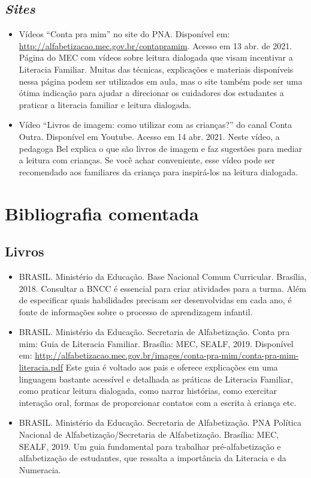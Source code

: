 \documentclass[11pt]{extarticle}
\begin{document}
\subsection{\textit{Sites}}

\begin{itemize}
\item Vídeos “Conta pra mim” no site do PNA. Disponível em: \url{http://alfabetizacao.mec.gov.br/contapramim}. 
Acesso em 13 abr. de 2021.
Página do MEC com vídeos sobre leitura dialogada que visam incentivar a Literacia Familiar. Muitas das 
técnicas, explicações e materiais disponíveis nessa página podem ser utilizados em aula, mas o site também 
pode ser uma ótima indicação para ajudar a direcionar os cuidadores dos estudantes a praticar 
a literacia familiar e leitura dialogada.

\item Vídeo “Livros de imagem: como utilizar com as crianças?” do canal Conta Outra. Disponível em Youtube. 
Acesso em 14 abr. 2021. 
Neste vídeo, a pedagoga Bel explica o que são livros de imagem e faz sugestões para mediar a leitura com 
crianças. Se você achar conveniente, esse vídeo pode ser recomendado aos familiares da criança 
para inspirá-los na leitura dialogada. 

\end{itemize}

\section{Bibliografia comentada}

\subsection{Livros}

\begin{itemize}
\item BRASIL. Ministério da Educação. Base Nacional Comum Curricular. Brasília, 2018.
Consultar a BNCC é essencial para criar atividades para a turma. Além de especificar 
quais habilidades precisam ser desenvolvidas em cada ano, é fonte de informações sobre 
o processo de aprendizagem infantil. 

\item BRASIL. Ministério da Educação. Secretaria de Alfabetização. Conta pra mim: Guia de Literacia Familiar. 
Brasília: MEC, SEALF, 2019. Disponível em: \url{http://alfabetizacao.mec.gov.br/images/conta-pra-mim/conta-pra-mim-literacia.pdf}
Este guia é voltado aos pais e oferece explicações em uma linguagem bastante acessível e detalhada as práticas de Literacia Familiar, 
como praticar leitura dialogada, como narrar histórias, como exercitar interação oral, formas de proporcionar contatos com a escrita à criança etc. 
 
\item BRASIL. Ministério da Educação. Secretaria de Alfabetização. PNA Política Nacional de Alfabetização/Secretaria 
de Alfabetização. Brasília: MEC, SEALF, 2019.
Um guia fundamental para trabalhar pré-alfabetização e alfabetização de estudantes, que ressalta a importância da Literacia e da Numeracia. 


\end{itemize}
\end{document}
